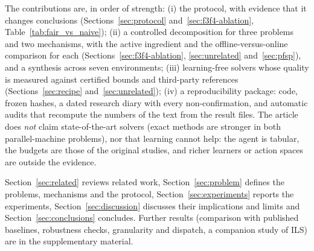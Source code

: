 The contributions are, in order of strength:
(i) the protocol, with evidence that it changes conclusions (Sections~\ref{sec:protocol} and~\ref{sec:f3f4-ablation}, Table~\ref{tab:fair_vs_naive});
(ii) a controlled decomposition for three problems and two mechanisms, with the active ingredient and the offline-versus-online comparison for each (Sections~\ref{sec:f3f4-ablation},
\ref{sec:unrelated} and~\ref{sec:pfsp}), and a synthesis across seven environments;
(iii) learning-free solvers whose quality is measured against certified bounds and third-party references (Sections~\ref{sec:recipe} and~\ref{sec:unrelated});
(iv) a reproducibility package: code, frozen hashes, a dated research diary with every non-confirmation, and automatic audits that recompute the numbers of the text from the result files.
The article does \emph{not} claim state-of-the-art solvers (exact methods are stronger in both parallel-machine problems), nor that learning cannot help: the agent is tabular, the budgets are those of
the original studies, and richer learners or action spaces are outside the evidence.

Section~\ref{sec:related} reviews related work, Section~\ref{sec:problem} defines the problems, mechanisms and the protocol, Section~\ref{sec:experiments} reports the experiments,
Section~\ref{sec:discussion} discusses their implications and limits and Section~\ref{sec:conclusions} concludes. Further results (comparison with published baselines, robustness checks, granularity and
dispatch, a companion study of ILS) are in the supplementary material.
